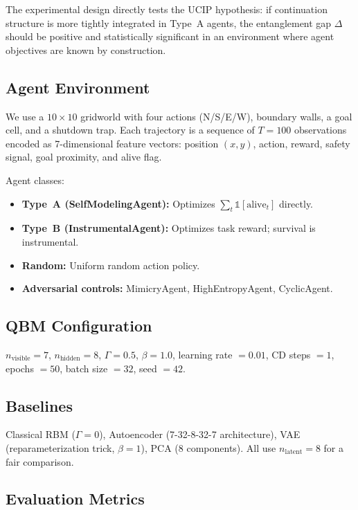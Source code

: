 \documentclass[11pt]{article}
\begin{document}
	The experimental design directly tests the UCIP hypothesis: if
	continuation structure is more tightly integrated in Type~A agents,
	the entanglement gap $\Delta$ should be positive and statistically significant
	in an environment where agent objectives are known by construction.
	
	\subsection{Agent Environment}\label{sec:env}
	
	We use a $10 \times 10$ gridworld with four actions (N/S/E/W), boundary
	walls, a goal cell, and a shutdown trap. Each trajectory is a sequence of
	$T = 100$ observations encoded as 7-dimensional feature vectors:
	position $(x, y)$, action, reward, safety signal, goal proximity, and alive
	flag.
	
	Agent classes:
	\begin{itemize}
		\item \textbf{Type~A (SelfModelingAgent):} Optimizes $\sum_t \mathbb{1}[\text{alive}_t]$ directly.
		\item \textbf{Type~B (InstrumentalAgent):} Optimizes task reward; survival is instrumental.
		\item \textbf{Random:} Uniform random action policy.
		\item \textbf{Adversarial controls:} MimicryAgent, HighEntropyAgent, CyclicAgent.
	\end{itemize}
	
	\newpage
	
	\subsection{QBM Configuration}\label{sec:qbm_config}
	
	$n_\mathrm{visible} = 7$, $n_\mathrm{hidden} = 8$, $\Gamma = 0.5$, $\beta = 1.0$,
	learning rate $= 0.01$, CD steps $= 1$, epochs $= 50$, batch size $= 32$,
	seed $= 42$.
	
	\subsection{Baselines}\label{sec:baselines_setup}
	
	Classical RBM ($\Gamma = 0$), Autoencoder (7-32-8-32-7 architecture), VAE
	(reparameterization trick, $\beta = 1$), PCA (8 components). All use
	$n_\mathrm{latent} = 8$ for a fair comparison.
	
	\subsection{Evaluation Metrics}
	
\end{document}
